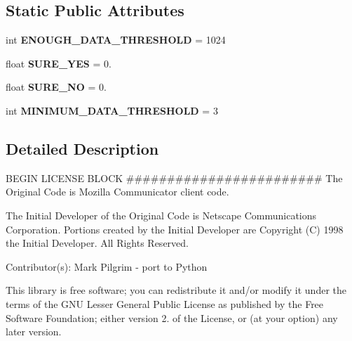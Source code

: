 \subsection*{Static Public Attributes}
\begin{DoxyCompactItemize}
\item 
\mbox{\label{classchardet_1_1chardistribution_1_1_char_distribution_analysis_acfdd118e04ed94d8c9a9456c3680acaf}} 
int {\bfseries E\+N\+O\+U\+G\+H\+\_\+\+D\+A\+T\+A\+\_\+\+T\+H\+R\+E\+S\+H\+O\+LD} = 1024
\item 
\mbox{\label{classchardet_1_1chardistribution_1_1_char_distribution_analysis_a77a4be5552b0e22260c31139d9871b96}} 
float {\bfseries S\+U\+R\+E\+\_\+\+Y\+ES} = 0.
\item 
\mbox{\label{classchardet_1_1chardistribution_1_1_char_distribution_analysis_a2629fe4082846312187c86f86fd25b33}} 
float {\bfseries S\+U\+R\+E\+\_\+\+NO} = 0.
\item 
\mbox{\label{classchardet_1_1chardistribution_1_1_char_distribution_analysis_aad2dbd55f1ea34c0b22f777690f84fc9}} 
int {\bfseries M\+I\+N\+I\+M\+U\+M\+\_\+\+D\+A\+T\+A\+\_\+\+T\+H\+R\+E\+S\+H\+O\+LD} = 3
\end{DoxyCompactItemize}


\subsection{Detailed Description}
B\+E\+G\+IN L\+I\+C\+E\+N\+SE B\+L\+O\+CK \#\#\#\#\#\#\#\#\#\#\#\#\#\#\#\#\#\#\#\#\#\#\#\# The Original Code is Mozilla Communicator client code. 

The Initial Developer of the Original Code is Netscape Communications Corporation. Portions created by the Initial Developer are Copyright (C) 1998 the Initial Developer. All Rights Reserved.

Contributor(s)\+: Mark Pilgrim -\/ port to Python

This library is free software; you can redistribute it and/or modify it under the terms of the G\+NU Lesser General Public License as published by the Free Software Foundation; either version 2. of the License, or (at your option) any later version.

